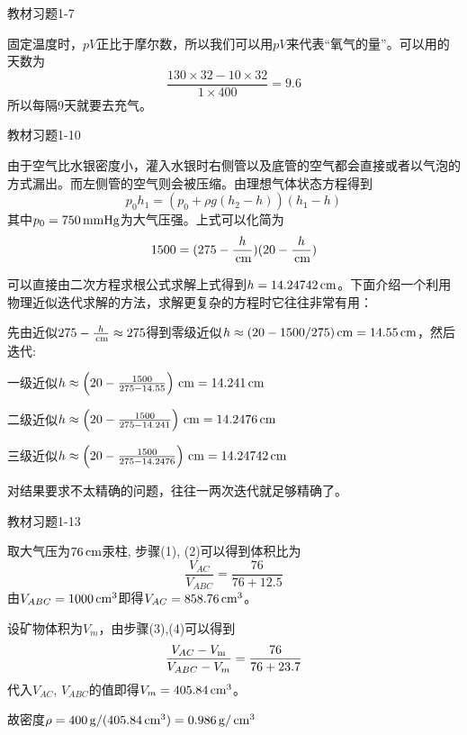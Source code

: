 \documentclass[CJK]{beamer}
\begin{document}
\begin{frame}
\bch
{\blue 教材习题1-7}

\skipline

{\small
固定温度时，$pV$正比于摩尔数，所以我们可以用$pV$来代表“氧气的量”。可以用的天数为
$$\frac{130\times 32 - 10\times 32}{1\times 400} = 9.6 $$
所以每隔9天就要去充气。
}
\ech
\end{frame}



\begin{frame}
\bch
{\blue 教材习题1-10}

{\scriptsize
由于空气比水银密度小，灌入水银时右侧管以及底管的空气都会直接或者以气泡的方式漏出。而左侧管的空气则会被压缩。由理想气体状态方程得到
$$ p_0 h_1 = \left(p_0+\rho g (h_2-h)\right) (h_1-h)$$
其中$p_0 =750 \,\mathrm{mmHg}$为大气压强。上式可以化简为
$$ 1500 = (275- \frac{h}{\,\mathrm{cm}}) (20 - \frac{h}{\,\mathrm{cm}})$$

可以直接由二次方程求根公式求解上式得到$h=14.24742\,\mathrm{cm}$。下面介绍一个利用物理近似迭代求解的方法，求解更复杂的方程时它往往非常有用：

先由近似$275-\frac{h}{\,\mathrm{cm}}\approx 275$得到零级近似$h \approx (20-1500/275)\,\mathrm{cm}=14.55\,\mathrm{cm}$，然后迭代:

一级近似$h\approx \left(20 - \frac{1500}{275-14.55}\right)\,\mathrm{cm} = 14.241\,\mathrm{cm}$

二级近似$h\approx \left(20 - \frac{1500}{275-14.241}\right)\,\mathrm{cm} = 14.2476\,\mathrm{cm}$

三级近似$h\approx \left(20 - \frac{1500}{275-14.2476}\right)\,\mathrm{cm} = 14.24742\,\mathrm{cm}$

对结果要求不太精确的问题，往往一两次迭代就足够精确了。
}
\ech
\end{frame}

\begin{frame}
\bch
{\blue 教材习题1-13}

\skipline

{\scriptsize
取大气压为$76\,\mathrm{cm}$汞柱, 步骤(1), (2)可以得到体积比为
$$\frac{V_{AC}}{V_{ABC}} = \frac{76}{76+12.5}$$
由$V_{ABC} = 1000\,\mathrm{cm}^3$即得$V_{AC} = 858.76 \,\mathrm{cm}^3$。

设矿物体积为$V_m$，由步骤(3),(4)可以得到
$$\frac{V_{AC}-V_{\rm m}}{V_{ABC}-V_m} = \frac{76}{76+23.7}$$
代入$V_{AC}$, $V_{ABC}$的值即得$V_m = 405.84\,\mathrm{cm}^3$。

故密度$\rho = 400\,\mathrm{g}/(405.84\,\mathrm{cm}^3) = 0.986 \,\mathrm{g}/\,\mathrm{cm}^3$
}
\ech
\end{frame}
\end{document}
